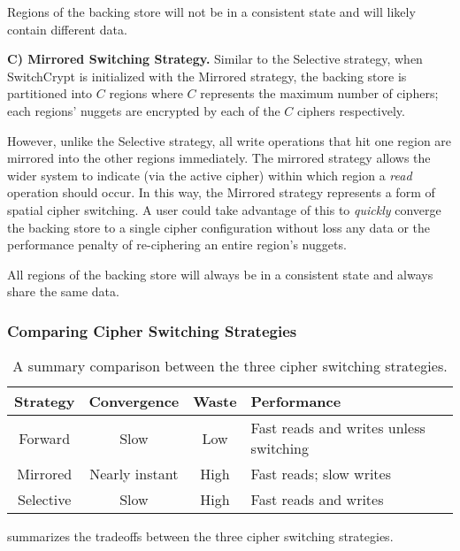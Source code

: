 Regions of the backing store will not be in a consistent state and will likely
contain different data.

\textbf{C) Mirrored Switching Strategy.} Similar to the Selective strategy, when
SwitchCrypt is initialized with the Mirrored strategy, the backing store is
partitioned into $C$ regions where $C$ represents the maximum number of ciphers;
each regions' nuggets are encrypted by each of the $C$ ciphers respectively.

However, unlike the Selective strategy, all write operations that hit one
region are mirrored into the other regions immediately. The mirrored
strategy allows the wider system to indicate (via the active cipher) within
which region a \emph{read} operation should occur. In this way, the Mirrored
strategy represents a form of spatial cipher switching. A user could take
advantage of this to \emph{quickly} converge the backing store to a single
cipher configuration without loss any data or the performance penalty of
re-ciphering an entire region's nuggets.

All regions of the backing store will always be in a consistent state and always
share the same data.

\subsubsection{Comparing Cipher Switching Strategies}

\begin{table}[]
   \begin{tabular}{@{}|c|c|c|C{25mm}|@{}}
      \toprule
      \textbf{Strategy} & \textbf{Convergence} & \textbf{Waste} & \textbf{Performance} \\ \midrule
      Forward   & Slow           & Low  & Fast reads and writes unless switching \\
      \hline
      Mirrored  & Nearly instant & High & Fast reads; slow writes \\
      \hline
      Selective & Slow           & High & Fast reads and writes  \\
      \hline
   \end{tabular}
   \caption{A summary comparison between the three cipher switching strategies.}
   \label{tbl:strategies-advantages}
\end{table}

 summarizes the tradeoffs between the three cipher
switching strategies.

